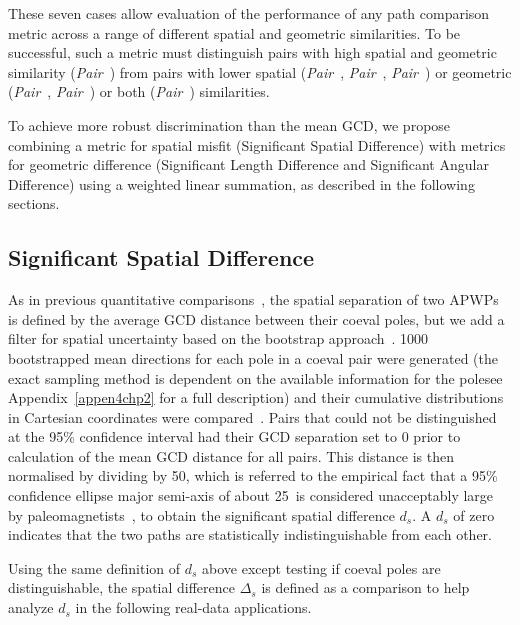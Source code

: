 These seven cases allow evaluation of the performance of any path comparison
metric across a range of different spatial and geometric similarities. To be
successful, such a metric must distinguish pairs with high spatial and geometric
similarity (\emph{Pair}~\textbf{}) from pairs with lower
spatial (\emph{Pair}~\textbf{},
\emph{Pair}~\textbf{},
\emph{Pair}~\textbf{})
or geometric (\emph{Pair}~\textbf{},
\emph{Pair}~\textbf{}) or both
(\emph{Pair}~\textbf{}) similarities.

To achieve more robust discrimination than the mean GCD, we propose combining a
metric for spatial misfit (Significant Spatial Difference) with metrics for
geometric difference (Significant Length Difference and Significant Angular
Difference) using a weighted linear summation, as described in the following
sections.

\subsection{Significant Spatial Difference}\label{sec:sigDs}

As in previous quantitative comparisons~\citep[for example]{S07,T08}, the
spatial separation of two APWPs is defined by the average GCD distance between
their coeval poles, but we add a filter for spatial uncertainty based on the
bootstrap approach~\citep{T91}. 1000 bootstrapped mean directions for each pole
in a coeval pair were generated (the exact sampling method is dependent on the
available information for the pole\textemdash{}see Appendix~\ref{appen4chp2} for
a full description) and their cumulative distributions in Cartesian coordinates
were compared~\citep{T91}. Pairs that could not be distinguished at the 95\%
confidence interval had their GCD separation set to 0 prior to calculation of
the mean GCD distance for all pairs. This distance is then normalised by
dividing by 50\degree, which is referred to the empirical fact that a 95\%
confidence ellipse major semi-axis of about 25\degree\ is considered
unacceptably large by paleomagnetists~\citep{B92}, to obtain the significant
spatial difference $d_s$. A $d_s$ of zero indicates that the two paths are
statistically indistinguishable from each other.

Using the same definition of $d_s$ above except testing if coeval poles are
distinguishable, the spatial difference $\Delta_s$ is defined as a comparison to
help analyze $d_s$ in the following real-data applications.

